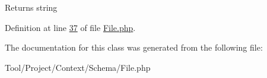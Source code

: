 \begin{DoxyReturn}{Returns}
string 
\end{DoxyReturn}


Definition at line \hyperlink{Schema_2File_8php_source_l00037}{37} of file \hyperlink{Schema_2File_8php_source}{File.\-php}.



The documentation for this class was generated from the following file\-:\begin{DoxyCompactItemize}
\item 
Tool/\-Project/\-Context/\-Schema/File.\-php\end{DoxyCompactItemize}
